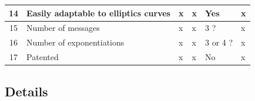\documentclass[../report.tex]{subfiles}
\begin{document}
\begin{center}
\begin{tabular}{ | c | p{8cm} || p{1cm} | p{1cm} | p{2cm} | p{2cm} | }
     
     14 & Easily adaptable to elliptics curves & x & x & Yes & x \\ \hline
     15 & Number of messages & x & x & 3 ? & x \\ \hline
     16 & Number of exponentiations & x & x & 3 or 4 ? & x \\ \hline
     17 & Patented & x & x & No & x \\ \hline

     \end{tabular}
 \end{center}
 
\subsection{Details} \label{sec:comparison_details}
\end{document}
